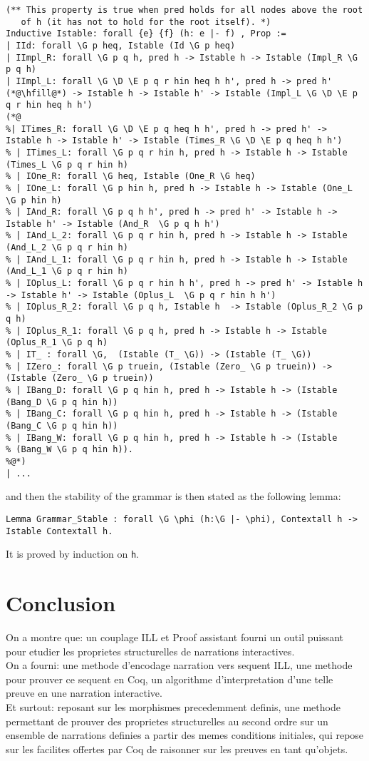 \documentclass[runningheads,a4paper]{llncs}
\begin{document}
\begin{lstlisting}
(** This property is true when pred holds for all nodes above the root
   of h (it has not to hold for the root itself). *)
Inductive Istable: forall {e} {f} (h: e |- f) , Prop := 
| IId: forall \G p heq, Istable (Id \G p heq)
| IImpl_R: forall \G p q h, pred h -> Istable h -> Istable (Impl_R \G p q h)
| IImpl_L: forall \G \D \E p q r hin heq h h', pred h -> pred h'
(*@\hfill@*) -> Istable h -> Istable h' -> Istable (Impl_L \G \D \E p q r hin heq h h')
(*@
%| ITimes_R: forall \G \D \E p q heq h h', pred h -> pred h' -> Istable h -> Istable h' -> Istable (Times_R \G \D \E p q heq h h')
% | ITimes_L: forall \G p q r hin h, pred h -> Istable h -> Istable (Times_L \G p q r hin h)
% | IOne_R: forall \G heq, Istable (One_R \G heq)
% | IOne_L: forall \G p hin h, pred h -> Istable h -> Istable (One_L \G p hin h)
% | IAnd_R: forall \G p q h h', pred h -> pred h' -> Istable h -> Istable h' -> Istable (And_R  \G p q h h')
% | IAnd_L_2: forall \G p q r hin h, pred h -> Istable h -> Istable (And_L_2 \G p q r hin h)
% | IAnd_L_1: forall \G p q r hin h, pred h -> Istable h -> Istable (And_L_1 \G p q r hin h)
% | IOplus_L: forall \G p q r hin h h', pred h -> pred h' -> Istable h -> Istable h' -> Istable (Oplus_L  \G p q r hin h h')
% | IOplus_R_2: forall \G p q h, Istable h  -> Istable (Oplus_R_2 \G p q h)
% | IOplus_R_1: forall \G p q h, pred h -> Istable h -> Istable (Oplus_R_1 \G p q h)
% | IT_ : forall \G,  (Istable (T_ \G)) -> (Istable (T_ \G))
% | IZero_: forall \G p truein, (Istable (Zero_ \G p truein)) -> (Istable (Zero_ \G p truein))
% | IBang_D: forall \G p q hin h, pred h -> Istable h -> (Istable (Bang_D \G p q hin h))
% | IBang_C: forall \G p q hin h, pred h -> Istable h -> (Istable (Bang_C \G p q hin h))
% | IBang_W: forall \G p q hin h, pred h -> Istable h -> (Istable
% (Bang_W \G p q hin h)).
%@*)
| ...
\end{lstlisting}
and then the stability of the grammar is then stated as the following lemma:
\begin{lstlisting}
Lemma Grammar_Stable : forall \G \phi (h:\G |- \phi), Contextall h -> Istable Contextall h.
\end{lstlisting}
It is proved by induction on \texttt{h}.


\section{Conclusion}
On a montre que: un couplage ILL et Proof assistant fourni un outil puissant pour etudier les proprietes structurelles de narrations interactives.\\
On a fourni: une methode d'encodage narration vers sequent ILL, une methode pour prouver ce sequent en Coq, un algorithme d'interpretation d'une telle preuve en une narration interactive.\\
Et surtout: reposant sur les morphismes precedemment definis, une methode permettant de prouver des proprietes structurelles au second ordre sur un ensemble de narrations definies a partir des memes conditions initiales, qui repose sur les facilites offertes par Coq de raisonner sur les preuves en tant qu'objets.
\end{document}
